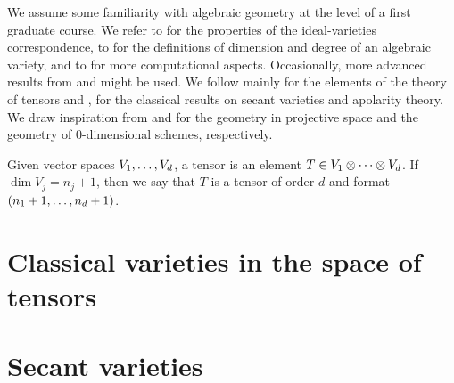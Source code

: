We assume some familiarity with algebraic geometry at the level of a first graduate course. We refer to \cite{Sha94} for the properties of the ideal-varieties correspondence, to \cite{Har92} for the definitions of dimension and degree of an algebraic variety, and to \cite{CLO07} for more computational aspects. Occasionally, more advanced results from \cite{Mum76} and \cite{Vak24} might be used. We follow mainly \cite{Lan12} for the elements of the theory of tensors and \cite{BCCGO18}, \cite{CGO14} for the classical results on secant varieties and apolarity theory. We draw inspiration from \cite{Rus16} and \cite{IK99} for the geometry in projective space and the geometry of $0$-dimensional schemes, respectively.

Given vector spaces $V_1 , \ldots , V_d$, a tensor is an element $T \in V_1 \otimes \cdots \otimes V_d$. If $\dim V_j = n_j +1 $, then we say that $T$ is a tensor of order $d$ and format $(n_1+1 , \ldots , n_d+1)$. 

\chapter{Classical varieties in the space of tensors}
\label{classicalAG-chapter-VarietiesTensorSpaces}


\chapter{Secant varieties}
\label{classicalAG-chapter-SecantVarieties}



% 
% 
% 
% 
% 


% 

